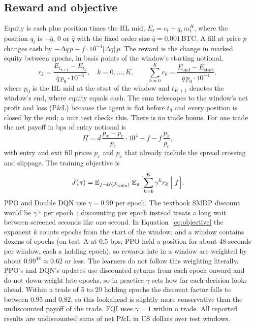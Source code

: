 \documentclass[12pt,a4paper]{article}
\DeclareRobustCommand{\bps}{\ifmmode\,\text{bps}\else\,bps\fi}
\newcommand{\E}{\mathbb{E}}
\begin{document}
\subsection{Reward and objective}
Equity is cash plus position times the HL mid, $E_t=c_t+q_t\,m^H_t$, where the position
$q_t$ is $-\bar q$, 0 or $\bar q$ with the fixed order size $\bar q=0.001$\,BTC. A fill at
price $p$ changes cash by $-\Delta q\,p-f\cdot10^{-4}|\Delta q|\,p$. The reward is the change
in marked equity between epochs, in basis points of the window's starting notional,
\begin{equation}
r_k=\frac{E_{t_{k+1}}-E_{t_k}}{\bar q\,p_0\cdot10^{-4}},\quad k=0,\ldots,K,\qquad
\sum_{k=0}^{K}r_k=\frac{E_{\text{end}}-E_{\text{start}}}{\bar q\,p_0\cdot10^{-4}},
\label{eq:reward}
\end{equation}
where $p_0$ is the HL mid at the start of the window and $t_{K+1}$ denotes the window's end,
where equity equals cash. The sum telescopes to the window's net profit and loss (P\&L)
because the agent is flat before $t_0$ and every position is closed by the end; a unit test
checks this. There is no trade bonus. For one trade the net payoff in bps of entry notional is
\begin{equation}
\Pi=d\,\frac{p_x-p_e}{p_e}\cdot10^4-f-f\,\frac{p_x}{p_e},
\label{eq:payoff}
\end{equation}
with entry and exit fill prices $p_e$ and $p_x$ that already include the spread crossing and
slippage. The training objective is
\begin{equation}
J(\pi)=\E_{f\sim\mathcal{U}(\mathcal{F}_{\text{train}})}\;\E_{\pi}\Bigl[\sum_{k=0}^{K}
\gamma^{k}r_k\;\Big|\;f\Bigr].
\label{eq:objective}
\end{equation}
PPO and Double DQN use $\gamma=0.99$ per epoch. The textbook SMDP discount would be
$\gamma^{\tau_k}$ per epoch~\cite{options}; discounting per epoch instead treats a long wait
between screened seconds like one second. In Equation~\eqref{eq:objective} the exponent $k$
counts epochs from the start of the window, and a window contains dozens of epochs (on test~A
at 0.5\bps, PPO held a position for about 48 seconds per window, each a holding epoch), so
rewards late in a window are weighted by about $0.99^{48}\approx0.62$ or less. The learners do
not follow this weighting literally. PPO's and DQN's updates use discounted returns from each
epoch onward and do not down-weight late epochs, so in practice $\gamma$ sets how far each
decision looks ahead. Within a trade of 5 to 20 holding epochs the discount factor falls to
between 0.95 and 0.82, so this lookahead is slightly more conservative than the undiscounted
payoff of the trade. FQI uses $\gamma=1$ within a trade. All reported results are
undiscounted sums of net P\&L in US dollars over test windows.
\end{document}
